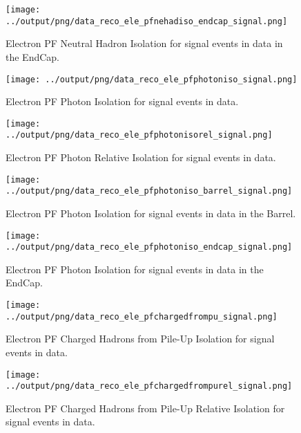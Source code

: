 \documentclass[11pt]{book}
\begin{document}
\begin{figure}[htb]
\centering
\texttt{[image: ../output/png/data\_reco\_ele\_pfnehadiso\_endcap\_signal.png]}
\caption{Electron PF Neutral Hadron Isolation for signal events in data in the EndCap.}
\label{fig:data_ele_pfnehadiso_endcap_signal}
\end{figure}

\begin{figure}[htb]
\centering
\texttt{[image: ../output/png/data\_reco\_ele\_pfphotoniso\_signal.png]}
\caption{Electron PF Photon Isolation for signal events in data.}
\label{fig:data_ele_pfphotoniso_signal}
\end{figure}

\begin{figure}[htb]
\centering
\texttt{[image: ../output/png/data\_reco\_ele\_pfphotonisorel\_signal.png]}
\caption{Electron PF Photon Relative Isolation for signal events in data.}
\label{fig:data_ele_pfphotonisorel_signal}
\end{figure}

\begin{figure}[htb]
\centering
\texttt{[image: ../output/png/data\_reco\_ele\_pfphotoniso\_barrel\_signal.png]}
\caption{Electron PF Photon Isolation for signal events in data in the Barrel.}
\label{fig:data_ele_pfphotoniso_barrel_signal}
\end{figure}

\begin{figure}[htb]
\centering
\texttt{[image: ../output/png/data\_reco\_ele\_pfphotoniso\_endcap\_signal.png]}
\caption{Electron PF Photon Isolation for signal events in data in the EndCap.}
\label{fig:data_ele_pfphotoniso_endcap_signal}
\end{figure}

\begin{figure}[htb]
\centering
\texttt{[image: ../output/png/data\_reco\_ele\_pfchargedfrompu\_signal.png]}
\caption{Electron PF Charged Hadrons from Pile-Up Isolation for signal events in data.}
\label{fig:data_ele_pfchargedfrompu_signal}
\end{figure}

\begin{figure}[htb]
\centering
\texttt{[image: ../output/png/data\_reco\_ele\_pfchargedfrompurel\_signal.png]}
\caption{Electron PF Charged Hadrons from Pile-Up Relative Isolation for signal events in data.}
\label{fig:data_ele_pfchargedfrompurel_signal}
\end{figure}
\end{document}
